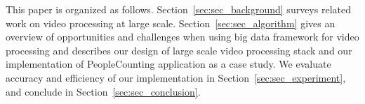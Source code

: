 This paper is organized as follows. Section~\ref{sec:sec_background} surveys
related work on video processing at large scale.
Section~\ref{sec:sec_algorithm} gives an overview of opportunities and
challenges when using big data framework for video processing and describes our
design of large scale video processing stack and our implementation of
PeopleCounting application as a case study. We evaluate accuracy and efficiency
of our implementation in Section~\ref{sec:sec_experiment}, and conclude in
Section~\ref{sec:sec_conclusion}.
